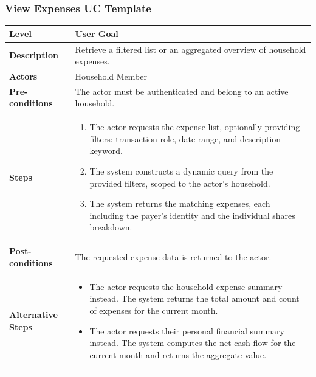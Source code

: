 \subsubsection{View Expenses UC Template}
\begin{longtable}{|p{3.5cm}|p{10.3cm}|}
\hline
\rowcolor{UCRow} \textbf{Level} & User Goal \\ \hline
\textbf{Description} & Retrieve a filtered list or an aggregated overview of household expenses. \\ \hline
\rowcolor{UCRow} \textbf{Actors} & Household Member \\ \hline
\textbf{Pre-conditions} & The actor must be authenticated and belong to an active household. \\ \hline
\rowcolor{UCRow} \textbf{Steps} &
\begin{enumerate}[nosep, leftmargin=*]
    \item The actor requests the expense list, optionally providing filters: transaction role, date range, and description keyword.
    \item The system constructs a dynamic query from the provided filters, scoped to the actor's household.
    \item The system returns the matching expenses, each including the payer's identity and the individual shares breakdown.
\end{enumerate} \\ \hline
\textbf{Post-conditions} & The requested expense data is returned to the actor. \\ \hline
\rowcolor{UCRow} \textbf{Alternative Steps} &
\begin{itemize}[nosep, leftmargin=2.5em]
    \item[\textbf{A1.}] The actor requests the household expense summary instead. The system returns the total amount and count of expenses for the current month.
    \item[\textbf{A2.}] The actor requests their personal financial summary instead. The system computes the net cash-flow for the current month and returns the aggregate value.
\end{itemize} \\ \hline
\end{longtable}

